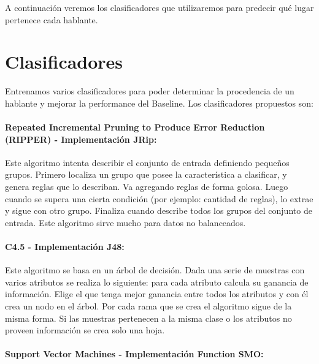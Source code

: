 A continuación veremos los clasificadores que utilizaremos para predecir qué lugar pertenece cada hablante.

\section{Clasificadores}

Entrenamos varios clasificadores para poder determinar la procedencia de un hablante y mejorar la performance del Baseline. Los clasificadores propuestos son: 

\paragraph{Repeated Incremental Pruning to Produce Error Reduction (RIPPER) \cite{Cohen1995} - Implementación JRip:}


Este algoritmo intenta describir el conjunto de entrada definiendo pequeños grupos. Primero localiza un grupo que posee la característica a clasificar, y genera reglas que lo describan. Va agregando reglas de forma golosa. Luego cuando se supera una cierta condición (por ejemplo: cantidad de reglas), lo extrae y sigue con otro grupo. Finaliza cuando describe todos los grupos del conjunto de entrada. Este algoritmo sirve mucho para datos no balanceados.

\paragraph{C4.5 \cite{Quinlan1993} - Implementación J48:}


Este algoritmo se basa en un árbol de decisión. Dada una serie de muestras con varios atributos se realiza lo siguiente: para cada atributo calcula su ganancia de información. Elige el que tenga mejor ganancia entre todos los atributos y con él crea un nodo en el árbol. Por cada rama que se crea el algoritmo sigue de la misma forma. Si las muestras pertenecen a la misma clase o los atributos no proveen información se crea solo una hoja.

\paragraph{Support Vector Machines \cite{Platt98sequentialminimal} - Implementación Function SMO:}

